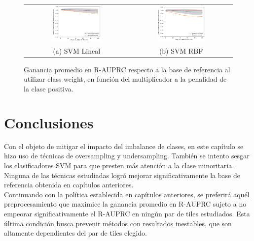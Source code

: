 \begin{figure}[h!]
\begin{tabular}{cc}
  \includegraphics[width=0.49\textwidth]{Kap7/cw/linearBEST.png} &   \includegraphics[width=0.49\textwidth]{Kap7/cw/rbfBEST.png} \\
(a) SVM Lineal& (b) SVM RBF
\end{tabular}
\caption{ Ganancia promedio en R-AUPRC respecto a la base de referencia al utilizar class weight, en función del multiplicador a la penalidad de la clase positiva.  }
\label{fig:overall_cw}
\end{figure}

\section{Conclusiones}
\label{conclusion_imb}

Con el objeto de mitigar el impacto del imbalance de clases, en este capítulo se hizo uso de técnicas de oversampling y undersampling. También se intento sesgar los clasificadores SVM para que presten más atención a la clase minoritaria. Ninguna de las técnicas estudiadas logró mejorar significativamente la base de referencia obtenida en capítulos anteriores. \\

Continuando con la política establecida en capítulos anteriores, se preferirá aquél preprocesamiento que maximice la ganancia promedio en R-AUPRC sujeto a no empeorar significativamente el R-AUPRC en ningún par de tiles estudiados. Esta última condición busca prevenir métodos con resultados inestables, que son altamente dependientes del par de tiles elegido. \\

